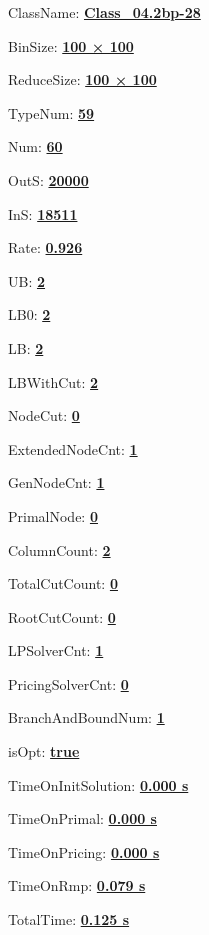 \documentclass[11pt]{article}
\begin{document}
\pagestyle{empty}


ClassName: \underline{\textbf{Class_04.2bp-28}}
\par
BinSize: \underline{\textbf{100 × 100}}
\par
ReduceSize: \underline{\textbf{100 × 100}}
\par
TypeNum: \underline{\textbf{59}}
\par
Num: \underline{\textbf{60}}
\par
OutS: \underline{\textbf{20000}}
\par
InS: \underline{\textbf{18511}}
\par
Rate: \underline{\textbf{0.926}}
\par
UB: \underline{\textbf{2}}
\par
LB0: \underline{\textbf{2}}
\par
LB: \underline{\textbf{2}}
\par
LBWithCut: \underline{\textbf{2}}
\par
NodeCut: \underline{\textbf{0}}
\par
ExtendedNodeCnt: \underline{\textbf{1}}
\par
GenNodeCnt: \underline{\textbf{1}}
\par
PrimalNode: \underline{\textbf{0}}
\par
ColumnCount: \underline{\textbf{2}}
\par
TotalCutCount: \underline{\textbf{0}}
\par
RootCutCount: \underline{\textbf{0}}
\par
LPSolverCnt: \underline{\textbf{1}}
\par
PricingSolverCnt: \underline{\textbf{0}}
\par
BranchAndBoundNum: \underline{\textbf{1}}
\par
isOpt: \underline{\textbf{true}}
\par
TimeOnInitSolution: \underline{\textbf{0.000 s}}
\par
TimeOnPrimal: \underline{\textbf{0.000 s}}
\par
TimeOnPricing: \underline{\textbf{0.000 s}}
\par
TimeOnRmp: \underline{\textbf{0.079 s}}
\par
TotalTime: \underline{\textbf{0.125 s}}
\par
\newpage
\end{document}
